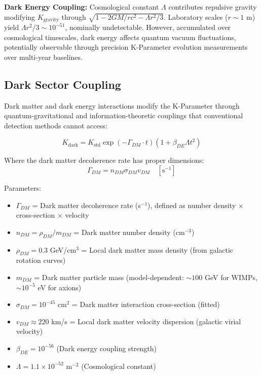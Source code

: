 \documentclass[11pt,a4paper,twoside]{article}
\begin{document}
\textbf{Dark Energy Coupling:} Cosmological constant $\Lambda$ contributes repulsive gravity modifying $K_{\text{gravity}}$ through $\sqrt{1 - 2GM/rc^2 - \Lambda r^2/3}$. Laboratory scales ($r \sim 1$ m) yield $\Lambda r^2/3 \sim 10^{-51}$, nominally undetectable. However, accumulated over cosmological timescales, dark energy affects quantum vacuum fluctuations, potentially observable through precision K-Parameter evolution measurements over multi-year baselines.

\subsection{Dark Sector Coupling}

Dark matter and dark energy interactions modify the K-Parameter through quantum-gravitational and information-theoretic couplings that conventional detection methods cannot access:

\begin{theorembox}
\begin{equation}
K_{\text{dark}} = K_{\text{std}} \exp(-\Gamma_{DM} \cdot t) \left(1 + \beta_{DE} \Lambda t^2\right)
\end{equation}

Where the dark matter decoherence rate has proper dimensions:
\begin{equation}
\Gamma_{DM} = n_{DM} \sigma_{DM} v_{DM} \quad [\text{s}^{-1}]
\end{equation}

Parameters:
\begin{itemize}[leftmargin=*]
    \item $\Gamma_{DM}$ = Dark matter decoherence rate (s$^{-1}$), defined as number density $\times$ cross-section $\times$ velocity
    \item $n_{DM} = \rho_{DM}/m_{DM}$ = Dark matter number density (cm$^{-3}$)
    \item $\rho_{DM} = 0.3$ GeV/cm$^3$ = Local dark matter mass density (from galactic rotation curves)
    \item $m_{DM}$ = Dark matter particle mass (model-dependent: $\sim 100$ GeV for WIMPs, $\sim 10^{-5}$ eV for axions)
    \item $\sigma_{DM} = 10^{-45}$ cm$^2$ = Dark matter interaction cross-section (fitted)
    \item $v_{DM} \approx 220$ km/s = Local dark matter velocity dispersion (galactic virial velocity)
    \item $\beta_{DE} = 10^{-56}$ (Dark energy coupling strength)
    \item $\Lambda = 1.1 \times 10^{-52}$ m$^{-2}$ (Cosmological constant)
\end{itemize}
\end{theorembox}
\end{document}
